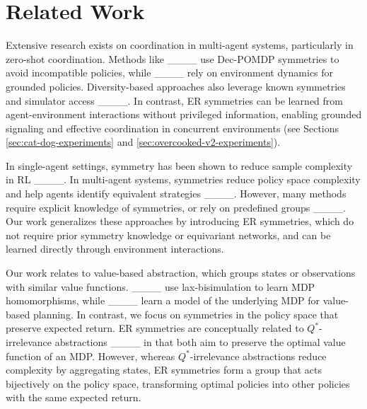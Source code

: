 \section{Related Work}
Extensive research exists on coordination in multi-agent systems, particularly in zero-shot coordination. Methods like ____ use Dec-POMDP symmetries to avoid incompatible policies, while ____ rely on environment dynamics for grounded policies. Diversity-based approaches also leverage known symmetries and simulator access ____. In contrast, ER symmetries can be learned from agent-environment interactions without privileged information, enabling grounded signaling and effective coordination in concurrent environments (see Sections \ref{sec:cat-dog-experiments} and \ref{sec:overcooked-v2-experiments}).

In single-agent settings, symmetry has been shown to reduce sample complexity in RL ____. In multi-agent systems, symmetries reduce policy space complexity and help agents identify equivalent strategies ____. However, many methods require explicit knowledge of symmetries, or rely on predefined groups ____. Our work generalizes these approaches by introducing ER symmetries, which do not require prior symmetry knowledge or equivariant networks, and can be learned directly through environment interactions.

Our work relates to value-based abstraction, which groups states or observations with similar value functions. ____ use lax-bisimulation to learn MDP homomorphisms, while ____ learn a model of the underlying MDP for value-based planning. In contrast, we focus on symmetries in the policy space that preserve expected return. ER symmetries are conceptually related to $Q^*$-irrelevance abstractions ____ in that both aim to preserve the optimal value function of an MDP. However, whereas $Q^*$-irrelevance abstractions reduce complexity by aggregating states, ER symmetries form a group that acts bijectively on the policy space, transforming optimal policies into other policies with the same expected return.